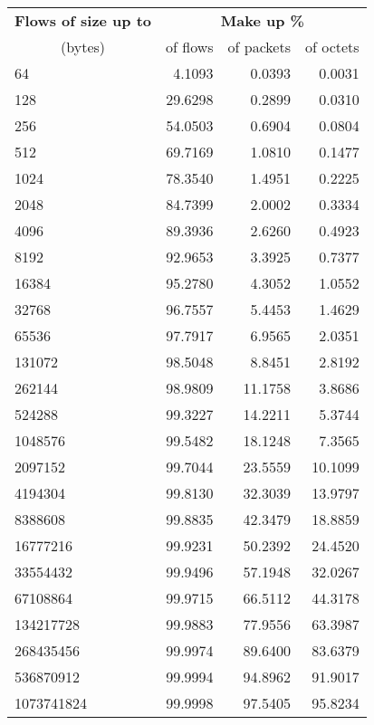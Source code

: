 \begin{tabular}{@{}lrrr@{}}
\toprule
\textbf{Flows of size up to} & \multicolumn{3}{c}{\textbf{Make up \%}} \\
\cmidrule(lr){2-4}
\multicolumn{1}{c}{(bytes)} & of flows & of packets & of octets \\
\midrule
64 & 4.1093 & 0.0393 & 0.0031 \\
128 & 29.6298 & 0.2899 & 0.0310 \\
256 & 54.0503 & 0.6904 & 0.0804 \\
512 & 69.7169 & 1.0810 & 0.1477 \\
1024 & 78.3540 & 1.4951 & 0.2225 \\
2048 & 84.7399 & 2.0002 & 0.3334 \\
4096 & 89.3936 & 2.6260 & 0.4923 \\
8192 & 92.9653 & 3.3925 & 0.7377 \\
16384 & 95.2780 & 4.3052 & 1.0552 \\
32768 & 96.7557 & 5.4453 & 1.4629 \\
65536 & 97.7917 & 6.9565 & 2.0351 \\
131072 & 98.5048 & 8.8451 & 2.8192 \\
262144 & 98.9809 & 11.1758 & 3.8686 \\
524288 & 99.3227 & 14.2211 & 5.3744 \\
1048576 & 99.5482 & 18.1248 & 7.3565 \\
2097152 & 99.7044 & 23.5559 & 10.1099 \\
4194304 & 99.8130 & 32.3039 & 13.9797 \\
8388608 & 99.8835 & 42.3479 & 18.8859 \\
16777216 & 99.9231 & 50.2392 & 24.4520 \\
33554432 & 99.9496 & 57.1948 & 32.0267 \\
67108864 & 99.9715 & 66.5112 & 44.3178 \\
134217728 & 99.9883 & 77.9556 & 63.3987 \\
268435456 & 99.9974 & 89.6400 & 83.6379 \\
536870912 & 99.9994 & 94.8962 & 91.9017 \\
1073741824 & 99.9998 & 97.5405 & 95.8234 \\
\bottomrule
\end{tabular}


